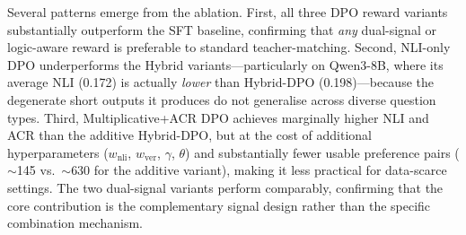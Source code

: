 \begin{table}[h]
\centering
\caption{Reward signal ablation (five-domain average). All DPO variants substantially improve over SFT baselines (see Tables~\ref{tab:cardiff_results}--\ref{tab:med_results_2}). Hybrid-DPO and Multiplicative+ACR achieve comparable overall performance, confirming that the dual-signal design is the key factor.}
\label{tab:ablation}
\end{table}

Several patterns emerge from the ablation. First, all three DPO reward variants substantially outperform the SFT baseline, confirming that \textit{any} dual-signal or logic-aware reward is preferable to standard teacher-matching. Second, NLI-only DPO underperforms the Hybrid variants---particularly on Qwen3-8B, where its average NLI (0.172) is actually \textit{lower} than Hybrid-DPO (0.198)---because the degenerate short outputs it produces do not generalise across diverse question types. Third, Multiplicative+ACR DPO achieves marginally higher NLI and ACR than the additive Hybrid-DPO, but at the cost of additional hyperparameters ($w_\text{nli}$, $w_\text{ver}$, $\gamma$, $\theta$) and substantially fewer usable preference pairs ($\sim$145 vs.\ $\sim$630 for the additive variant), making it less practical for data-scarce settings. The two dual-signal variants perform comparably, confirming that the core contribution is the complementary signal design rather than the specific combination mechanism.

